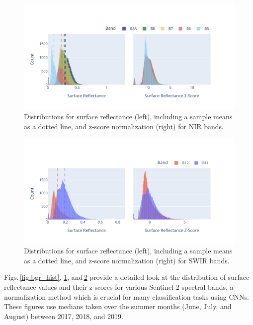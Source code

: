 \begin{figure}[ht]
    \centering
    \includegraphics[width=0.98\linewidth, trim={15pt 25pt 10pt 50pt}, clip]{figures/figures_features/nir_hist.pdf}
    \caption{Distributions for surface reflectance (left), including a sample means as a dotted line, and z-score normalization (right) for NIR bands.}
    \label{fig:nir_hist}
\end{figure}

\begin{figure}[ht]
    \centering
    \includegraphics[width=0.98\linewidth, trim={15pt 25pt 10pt 50pt}, clip]{figures/figures_features/swir_hist.pdf}
    \caption{Distributions for surface reflectance (left), including a sample means as a dotted line, and z-score normalization (right) for SWIR bands.}
    \label{fig:swir_hist}
\end{figure}

Figs.\,\ref{fig:bgr_hist}, \ref{fig:nir_hist}, and\,\ref{fig:swir_hist} provide a detailed look at the distribution of surface reflectance values and their z-scores for various Sentinel-2 spectral bands, a normalization method which is crucial for many classification tasks using CNNs. These figures use medians taken over the summer months (June, July, and August) between 2017, 2018, and 2019.

